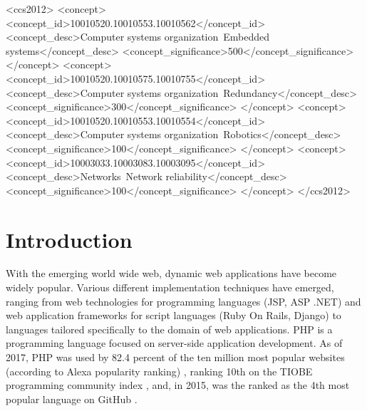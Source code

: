 \documentclass[sigconf, preprint]{acmart}
\begin{document}
%
%
\begin{CCSXML}
<ccs2012>
 <concept>
  <concept_id>10010520.10010553.10010562</concept_id>
  <concept_desc>Computer systems organization~Embedded systems</concept_desc>
  <concept_significance>500</concept_significance>
 </concept>
 <concept>
  <concept_id>10010520.10010575.10010755</concept_id>
  <concept_desc>Computer systems organization~Redundancy</concept_desc>
  <concept_significance>300</concept_significance>
 </concept>
 <concept>
  <concept_id>10010520.10010553.10010554</concept_id>
  <concept_desc>Computer systems organization~Robotics</concept_desc>
  <concept_significance>100</concept_significance>
 </concept>
 <concept>
  <concept_id>10003033.10003083.10003095</concept_id>
  <concept_desc>Networks~Network reliability</concept_desc>
  <concept_significance>100</concept_significance>
 </concept>
</ccs2012>  
\end{CCSXML}




\maketitle

\section{Introduction}
With the emerging world wide web, dynamic web applications have become
widely popular. Various different implementation techniques have emerged,
ranging from web technologies for programming languages (JSP, ASP .NET) and web
application frameworks for  script languages (Ruby On Rails, Django) to
languages tailored specifically to the domain of web applications. PHP
\cite{phpNET} is a programming language focused on server-side application
development. As of 2017, PHP was used by 82.4 percent of the ten million most
popular websites (according to Alexa popularity ranking) \cite{alexaPHP},
ranking 10th on the TIOBE programming community index \cite{tiobePHP}, and, in
2015,  was the ranked as the 4th most popular language on GitHub
\cite{githubPHP}.
\end{document}
